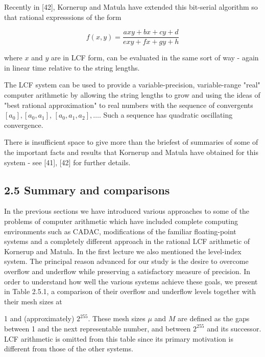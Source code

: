 \documentclass[10pt]{article}
\begin{document}
Recently in [42], Kornerup and Matula have extended this bit-serial algorithm so that rational expresssions of the form

$$
f(x, y)=\frac{a x y+b x+c y+d}{e x y+f x+g y+h}
$$

where $x$ and $y$ are in LCF form, can be evaluated in the same sort of way - again in linear time relative to the string lengths.

The LCF system can be used to provide a variable-precision, variable-range "real" computer arithmetic by allowing the string lengths to grow and using the ideas of "best rational approximation" to real numbers with the sequence of convergents $\left[a_{0}\right],\left[a_{0}, a_{1}\right]$, $\left[a_{0}, a_{1}, a_{2}\right], \ldots$. Such a sequence has quadratic oscillating convergence.

There is insufficient space to give more than the briefest of summaries of some of the important facts and results that Kornerup and Matula have obtained for this system - see [41], [42] for further details.

\subsection*{2.5 Summary and comparisons}
In the previous sections we have introduced various approaches to some of the problems of computer arithmetic which have included complete computing environments such as CADAC, modifications of the familiar floating-point systems and a completely different approach in the rational LCF arithmetic of Kornerup and Matula. In the first lecture we also mentioned the level-index system. The principal reason advanced for our study is the desire to overcome overflow and underflow while preserving a satisfactory measure of precision. In order to understand how well the various systems achieve these goals, we present in Table 2.5.1, a comparison of their overflow and underflow levels together with their mesh sizes at

1 and (approximately) $2^{255}$. These mesh sizes $\mu$ and $M$ are defined as the gaps between 1 and the next representable number, and between $2^{255}$ and its successor. LCF arithmetic is omitted from this table since its primary motivation is different from those of the other systems.
\end{document}
